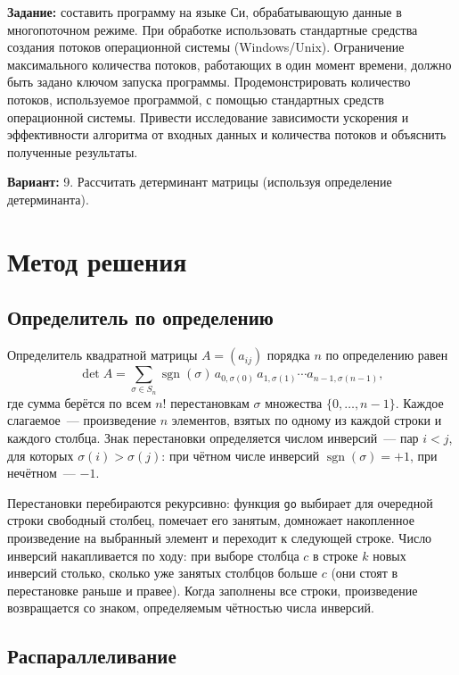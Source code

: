 \documentclass[pdf, unicode, 12pt, a4paper, oneside, fleqn]{article}
\begin{document}
{\bfseries Задание:} составить программу на языке Си, обрабатывающую данные
в многопоточном режиме. При обработке использовать стандартные средства создания
потоков операционной системы (Windows/Unix). Ограничение максимального количества
потоков, работающих в один момент времени, должно быть задано ключом запуска программы.
Продемонстрировать количество потоков, используемое программой, с помощью стандартных
средств операционной системы. Привести исследование зависимости ускорения и эффективности
алгоритма от входных данных и количества потоков и объяснить полученные результаты.

{\bfseries Вариант:} 9. Рассчитать детерминант матрицы (используя определение детерминанта).

\section{Метод решения}

\subsection*{Определитель по определению}

Определитель квадратной матрицы $A = (a_{ij})$ порядка $n$ по определению равен
\[
    \det A = \sum_{\sigma \in S_n} \operatorname{sgn}(\sigma)\, a_{0,\sigma(0)}\, a_{1,\sigma(1)} \cdots a_{n-1,\sigma(n-1)},
\]
где сумма берётся по всем $n!$ перестановкам $\sigma$ множества $\{0, \dots, n-1\}$.
Каждое слагаемое~--- произведение $n$ элементов, взятых по одному из каждой строки
и каждого столбца. Знак перестановки определяется числом инверсий~--- пар $i < j$,
для которых $\sigma(i) > \sigma(j)$: при чётном числе инверсий $\operatorname{sgn}(\sigma) = +1$,
при нечётном~--- $-1$.

Перестановки перебираются рекурсивно: функция \texttt{go}
выбирает для очередной строки свободный столбец, помечает его занятым, домножает
накопленное произведение на выбранный элемент и переходит к следующей строке.
Число инверсий накапливается по ходу: при выборе столбца $c$ в строке $k$ новых
инверсий столько, сколько уже занятых столбцов больше $c$ (они стоят в перестановке
раньше и правее). Когда заполнены все строки, произведение возвращается со знаком,
определяемым чётностью числа инверсий.

\subsection*{Распараллеливание}
\end{document}

